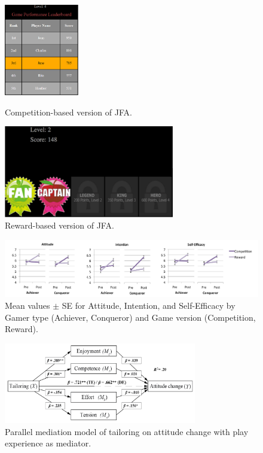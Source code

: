 \documentclass[12pt]{article}
\begin{document}
\begin{figure}[H]
\centering
  \includegraphics[height=4cm]{img/orji2017-junk-food-aliens-competition.png}
  \caption{Competition-based version of JFA.}\label{fig:orji2017-junk-food-aliens-competition}
\endminipage\hfill
{}%
\centering
  \includegraphics[height=4cm]{img/orji2017-junk-food-aliens-reward.png}
  \caption{Reward-based version of JFA.}\label{fig:orji2017-junk-food-aliens-reward}
\endminipage
\end{figure}


\begin{figure}[H]
\centering
\includegraphics[width=\textwidth]{img/orji2017-tailoring-results.png} 
\caption{Mean values $\pm$ SE for Attitude, Intention, and Self-Efficacy by Gamer type (Achiever, Conqueror) and Game version (Competition, Reward).}\label{fig:orji2017-tailoring-results}
\end{figure}

\begin{figure}[H]
\centering
\includegraphics[width=0.75\textwidth]{img/orji2017-tailoring-mediation-results.png} 
\caption{Parallel mediation model of tailoring on attitude change with play experience as mediator.}\label{fig:orji2017-tailoring-mediation-results}
\end{figure}




\newpage

\end{document}
